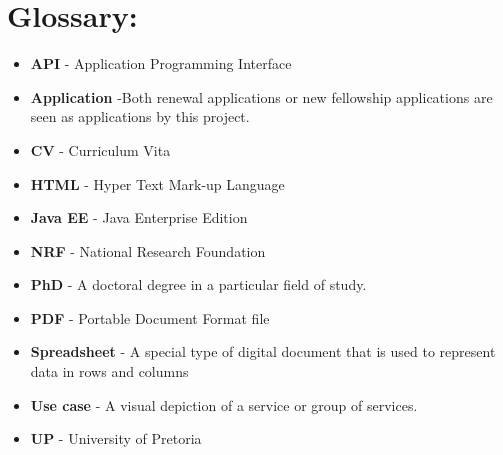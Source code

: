 \documentclass[12pt]{article}
\begin{document}
\newpage
\section{Glossary:}
\vspace{0.2in}

\begin{itemize}

\item \textbf{API} - Application Programming Interface
\item \textbf{Application} -Both renewal applications or new fellowship applications are seen as applications by this project.
\item \textbf{CV} - Curriculum Vita
\item \textbf{HTML} - Hyper Text Mark-up Language
\item \textbf{Java EE} - Java Enterprise Edition
\item \textbf{NRF} - National Research Foundation
\item \textbf{PhD} - A doctoral degree in a particular field of study.
\item \textbf{PDF} - Portable Document Format file
\item \textbf{Spreadsheet} - A special type of digital document that is used to represent data in rows and columns
\item \textbf{Use case} - A visual depiction of a service or group of services.
\item \textbf{UP} - University of Pretoria
 


\end{itemize}	
\end{document}
